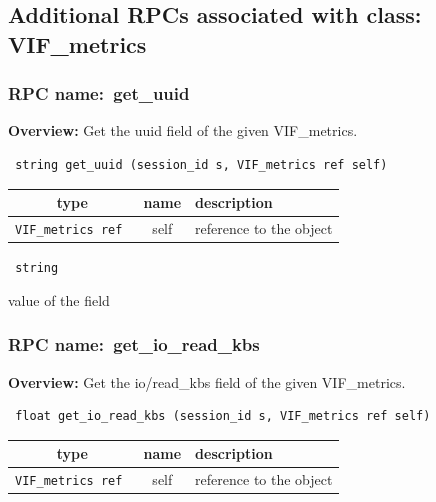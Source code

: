 \subsection{Additional RPCs associated with class: VIF\_metrics}
\subsubsection{RPC name:~get\_uuid}

{\bf Overview:} 
Get the uuid field of the given VIF\_metrics.

\begin{verbatim} string get_uuid (session_id s, VIF_metrics ref self)\end{verbatim}



 
\vspace{0.3cm}
\begin{tabular}{|c|c|p{7cm}|}
 \hline
{\bf type} & {\bf name} & {\bf description} \\ \hline
{\tt VIF\_metrics ref } & self & reference to the object \\ \hline 

\end{tabular}

\vspace{0.3cm}

{\tt 
string
}


value of the field
\vspace{0.3cm}
\vspace{0.3cm}
\vspace{0.3cm}
\subsubsection{RPC name:~get\_io\_read\_kbs}

{\bf Overview:} 
Get the io/read\_kbs field of the given VIF\_metrics.

\begin{verbatim} float get_io_read_kbs (session_id s, VIF_metrics ref self)\end{verbatim}



 
\vspace{0.3cm}
\begin{tabular}{|c|c|p{7cm}|}
 \hline
{\bf type} & {\bf name} & {\bf description} \\ \hline
{\tt VIF\_metrics ref } & self & reference to the object \\ \hline 

\end{tabular}

